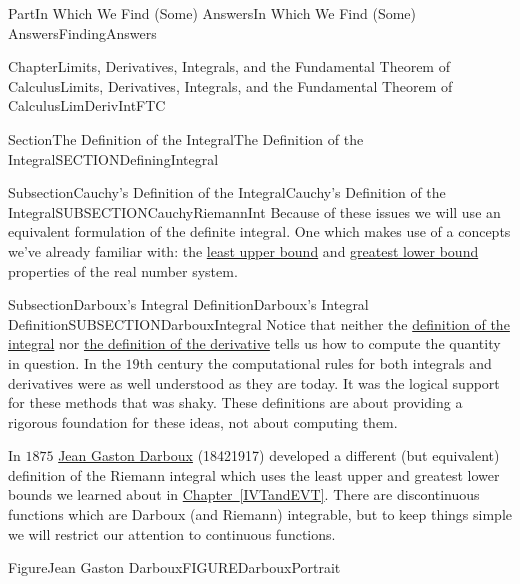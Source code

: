 \documentclass[oneside,10pt,]{book}
\newcommand{\xreffont}{\relax}
\numberwithin{equation}{part}
\begin{document}
\begin{partptx}{Part}{In Which We Find (Some) Answers}{}{In Which We Find (Some) Answers}{}{}{FindingAnswers}
\begin{chapterptx}{Chapter}{Limits, Derivatives, Integrals, and the Fundamental Theorem of Calculus}{}{Limits, Derivatives, Integrals, and the Fundamental Theorem of Calculus}{}{}{LimDerivIntFTC}
\begin{sectionptx}{Section}{The Definition of the Integral}{}{The Definition of the Integral}{}{}{SECTIONDefiningIntegral}
\begin{subsectionptx}{Subsection}{Cauchy's Definition of the Integral}{}{Cauchy's Definition of the Integral}{}{}{SUBSECTIONCauchyRiemannInt}
Because of these issues we will use an equivalent formulation of the definite integral. One which makes use of a concepts we've already familiar with: the \hyperref[thm_LUB]{least upper bound} and \hyperref[PROBLEMGreatestLowerBound]{greatest lower bound} properties of the real number system.    %
\end{subsectionptx}
%
%
\typeout{************************************************}
\typeout{************************************************}
%
\begin{subsectionptx}{Subsection}{Darboux's Integral Definition}{}{Darboux's Integral Definition}{}{}{SUBSECTIONDarbouxIntegral}
Notice that neither the \hyperref[DEFINITIONRiemannIntegral]{definition of the integral} nor \hyperref[def_derivative]{the definition of the derivative} tells us how to compute the quantity in question. In the \(19\)th century the computational rules for both integrals and derivatives were as well understood as they are today.  It was the logical support for these methods that was shaky. These definitions are about providing a rigorous foundation for these ideas, not about computing them.%
\par
In \(1875\) \href{https://mathshistory.st-andrews.ac.uk/Biographies/Darboux/}{Jean Gaston Darboux} (1842\textendash{}1917) developed a different (but equivalent) definition of the Riemann integral which uses the least upper and greatest lower bounds we learned about in \hyperref[IVTandEVT]{Chapter~{\xreffont\ref{IVTandEVT}}}.  There are discontinuous functions which are Darboux (and Riemann) integrable, but to keep things simple we will restrict our attention to continuous functions.%
\begin{figureptx}{Figure}{Jean Gaston Darboux}{FIGUREDarbouxPortrait}{}%
%
%
\begin{image}{0.325}{0.35}{0.325}{}%

\end{image}
\end{figureptx}
\end{subsectionptx}
\end{sectionptx}
\end{chapterptx}
\end{partptx}
\end{document}
